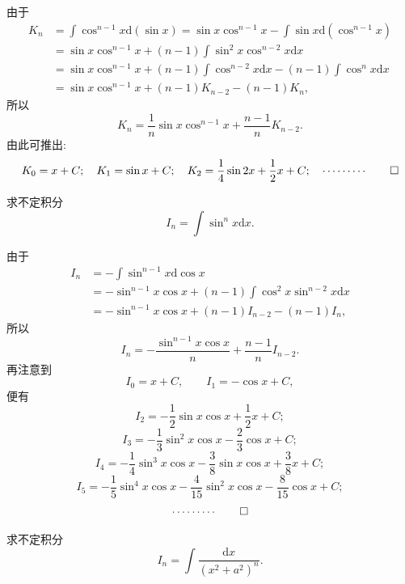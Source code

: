 \begin{solve}
由于
\[
\begin{aligned}
  K_n
  &=
  \int\cos^{n-1}x\mathrm d(\sin x)
  =
  \sin x\cos^{n-1}x-\int\sin x\mathrm d(\cos^{n-1}x)\\
  &=
  \sin x\cos^{n-1}x+(n-1)\int\sin^2x\cos^{n-2}x\mathrm dx\\
  &=
  \sin x\cos^{n-1}x+(n-1)\int\cos^{n-2}x\mathrm dx
  -(n-1)\int\cos^nx\mathrm dx\\
  &=
  \sin x\cos^{n-1}x+(n-1)K_{n-2}-(n-1)K_n,
\end{aligned}
\]
所以
\[
  K_n=\frac1n\sin x\cos^{n-1}x+\frac{n-1}nK_{n-2}.
\]
由此可推出:
\[
  K_0=x+C;\quad
  K_1=\sin x+C;\quad
  K_2=\frac14\sin2x+\frac12x+C;\quad
  \cdots\cdots\cdots
\qedhere
\]
\end{solve}


\begin{example}\label{example:ma-6-2-25}
求不定积分
\[
  I_n=\int\sin^nx\mathrm dx.
\]
\end{example}


\begin{solve}
由于
\[
\begin{aligned}
  I_n
  &=
  -\int\sin^{n-1}x\mathrm d\cos x\\
  &=
  -\sin^{n-1}x\cos x+(n-1)\int\cos^2x\sin^{n-2}x\mathrm dx\\
  &=
  -\sin^{n-1}x\cos x+(n-1)I_{n-2}-(n-1)I_n,
\end{aligned}
\]
所以
\[
  I_n=-\frac{\sin^{n-1}x\cos x}{n}+\frac{n-1}{n}I_{n-2}.
\]
再注意到
\[
  I_0=x+C,\qquad I_1=-\cos x+C,
\]
便有
\[
  I_2=-\frac12\sin x\cos x+\frac12x+C;
\]
\[
  I_3=-\frac13\sin^2x\cos x-\frac23\cos x+C;
\]
\[
  I_4=-\frac14\sin^3x\cos x-\frac38\sin x\cos x+\frac38x+C;
\]
\[
  I_5=-\frac15\sin^4x\cos x-\frac4{15}\sin^2x\cos x-\frac8{15}\cos x+C;
\]
\[
  \cdots\cdots\cdots
\qedhere
\]
\end{solve}


\begin{example}\label{example:ma-6-2-26}
求不定积分
\[
  I_n=\int\frac{\mathrm dx}{(x^2+a^2)^n}.
\]
\end{example}


